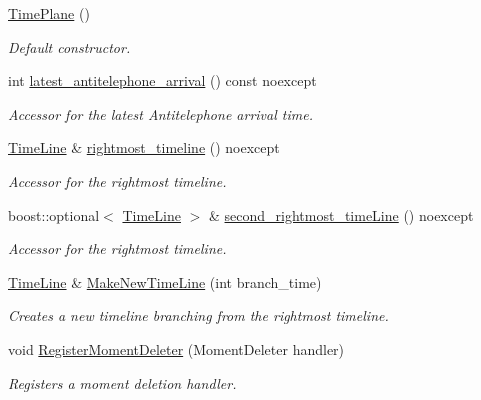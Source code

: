 \begin{DoxyCompactItemize}
\item 
\hyperlink{classtimeplane_1_1_time_plane_a8d8f1227ade6490fa8b814f1b7f18ecc}{Time\+Plane} ()
\begin{DoxyCompactList}\small\item\em Default constructor. \end{DoxyCompactList}\item 
int \hyperlink{classtimeplane_1_1_time_plane_ae66d15a7ce9adb5f63906011a455400b}{latest\+\_\+antitelephone\+\_\+arrival} () const noexcept
\begin{DoxyCompactList}\small\item\em Accessor for the latest Antitelephone arrival time. \end{DoxyCompactList}\item 
\hyperlink{classtimeplane_1_1_time_line}{Time\+Line} \& \hyperlink{classtimeplane_1_1_time_plane_a317c9e247011cf5f4e6e36f2f7651932}{rightmost\+\_\+timeline} () noexcept
\begin{DoxyCompactList}\small\item\em Accessor for the rightmost timeline. \end{DoxyCompactList}\item 
boost\+::optional$<$ \hyperlink{classtimeplane_1_1_time_line}{Time\+Line} $>$ \& \hyperlink{classtimeplane_1_1_time_plane_a32da05c87dfe4bc33ec5cb87fd97297f}{second\+\_\+rightmost\+\_\+time\+Line} () noexcept
\begin{DoxyCompactList}\small\item\em Accessor for the rightmost timeline. \end{DoxyCompactList}\item 
\hyperlink{classtimeplane_1_1_time_line}{Time\+Line} \& \hyperlink{classtimeplane_1_1_time_plane_ab8c82092c1c5c3f18c8677f8ce38662c}{Make\+New\+Time\+Line} (int branch\+\_\+time)
\begin{DoxyCompactList}\small\item\em Creates a new timeline branching from the rightmost timeline. \end{DoxyCompactList}\item 
void \hyperlink{classtimeplane_1_1_time_plane_a10f6e26c2043a2d2cb0271a06c2495d0}{Register\+Moment\+Deleter} (Moment\+Deleter handler)
\begin{DoxyCompactList}\small\item\em Registers a moment deletion handler. \end{DoxyCompactList}\end{DoxyCompactItemize}
